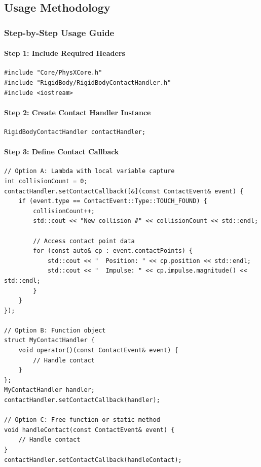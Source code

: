 
\subsection{Usage Methodology}

\subsubsection{Step-by-Step Usage Guide}

\paragraph{Step 1: Include Required Headers}

\begin{lstlisting}[style=cpp]
#include "Core/PhysXCore.h"
#include "RigidBody/RigidBodyContactHandler.h"
#include <iostream>
\end{lstlisting}

\paragraph{Step 2: Create Contact Handler Instance}

\begin{lstlisting}[style=cpp]
RigidBodyContactHandler contactHandler;
\end{lstlisting}

\paragraph{Step 3: Define Contact Callback}

\begin{lstlisting}[style=cpp]
// Option A: Lambda with local variable capture
int collisionCount = 0;
contactHandler.setContactCallback([&](const ContactEvent& event) {
    if (event.type == ContactEvent::Type::TOUCH_FOUND) {
        collisionCount++;
        std::cout << "New collision #" << collisionCount << std::endl;

        // Access contact point data
        for (const auto& cp : event.contactPoints) {
            std::cout << "  Position: " << cp.position << std::endl;
            std::cout << "  Impulse: " << cp.impulse.magnitude() << std::endl;
        }
    }
});

// Option B: Function object
struct MyContactHandler {
    void operator()(const ContactEvent& event) {
        // Handle contact
    }
};
MyContactHandler handler;
contactHandler.setContactCallback(handler);

// Option C: Free function or static method
void handleContact(const ContactEvent& event) {
    // Handle contact
}
contactHandler.setContactCallback(handleContact);
\end{lstlisting}

